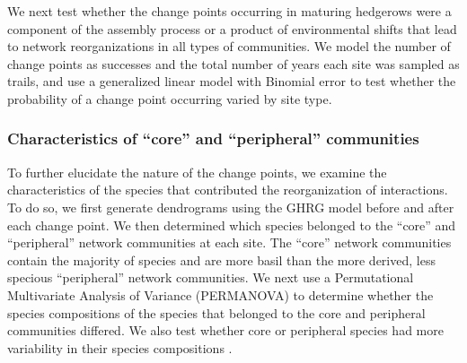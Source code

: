 \documentclass[12pt]{article}
\begin{document}
We next test whether the change points occurring in maturing hedgerows
were a component of the assembly process or a product of environmental
shifts that lead to network reorganizations in all types of
communities. We model the number of change points as successes and the
total number of years each site was sampled as trails, and use a
generalized linear model with Binomial error to test whether the
probability of a change point occurring varied by site type.

\subsubsection*{Characteristics of ``core'' and ``peripheral'' communities}
To further elucidate the nature of the change points, we examine the
characteristics of the species that contributed the reorganization of
interactions. To do so, we first generate dendrograms using the GHRG
model before and after each change point.  We then determined which
species belonged to the ``core'' and ``peripheral'' network
communities at each site. The ``core'' network communities contain the
majority of species and are more basil than the more derived, less
specious ``peripheral'' network communities. We next use a
Permutational Multivariate Analysis of Variance (PERMANOVA)
\citep{anderson-2013-557} to determine whether the species
compositions of the species that belonged to the core and peripheral
communities differed. We also test whether core or peripheral species
had more variability in their species compositions \citep[i.e.,
multivariate dispersion, ][]{anderson-2011-19,
  anderson-2006-683}. 

\end{document}
